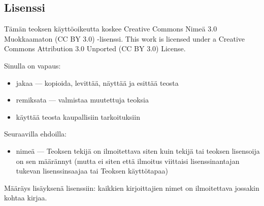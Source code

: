 \subsection*{Lisenssi}

Tämän teoksen käyttöoikeutta koskee Creative Commons Nimeä 3.0 Muokkaamaton (CC BY 3.0) -lisenssi.
This work is licensed under a Creative Commons Attribution 3.0 Unported (CC BY 3.0) License.


Sinulla on vapaus:
\begin{itemize}
\item jakaa — kopioida, levittää, näyttää ja esittää teosta
\item remiksata — valmistaa muutettuja teoksia
\item käyttää teosta kaupallisiin tarkoituksiin
\end{itemize}
Seuraavilla ehdoilla:
\begin{itemize}
\item nimeä — Teoksen tekijä on ilmoitettava siten kuin tekijä tai teoksen lisensoija on sen määrännyt (mutta ei siten että ilmoitus viittaisi lisenssinantajan tukevan lisenssinsaajaa tai Teoksen käyttötapaa)
\end{itemize}

Määräys lisäyksenä lisenssiin: kaikkien kirjoittajien nimet on ilmoitettava jossakin kohtaa kirjaa.

